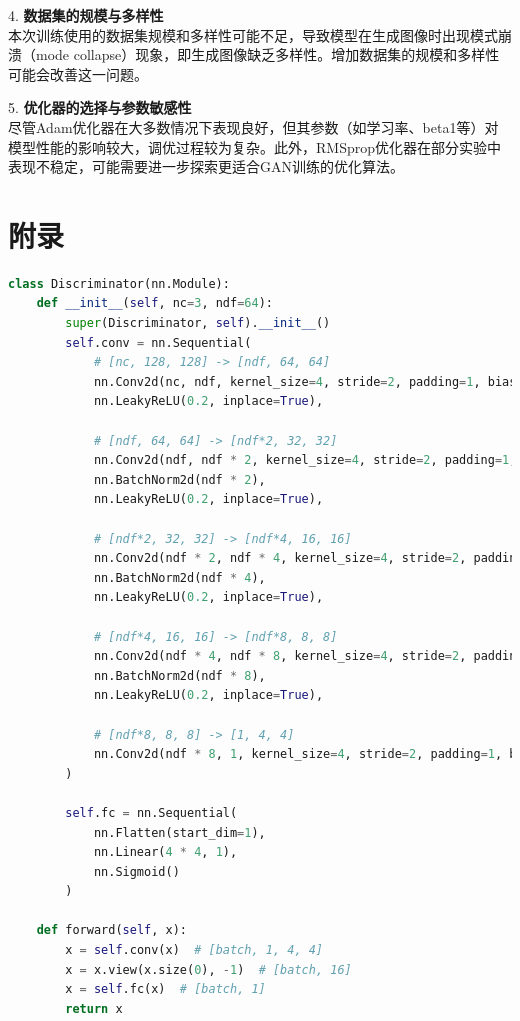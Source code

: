 \documentclass[UTF8]{ctexart}
\begin{document}
4. \textbf{数据集的规模与多样性}\\
   本次训练使用的数据集规模和多样性可能不足，导致模型在生成图像时出现模式崩溃（mode collapse）现象，即生成图像缺乏多样性。增加数据集的规模和多样性可能会改善这一问题。

5. \textbf{优化器的选择与参数敏感性}\\
   尽管Adam优化器在大多数情况下表现良好，但其参数（如学习率、beta1等）对模型性能的影响较大，调优过程较为复杂。此外，RMSprop优化器在部分实验中表现不稳定，可能需要进一步探索更适合GAN训练的优化算法。

   



\newpage
\section{附录}
\begin{lstlisting}[language=Python, caption={判别器设计}, label={lst:code2}, mathescape=true, breaklines=true]
class Discriminator(nn.Module):
    def __init__(self, nc=3, ndf=64):
        super(Discriminator, self).__init__()
        self.conv = nn.Sequential(
            # [nc, 128, 128] -> [ndf, 64, 64]
            nn.Conv2d(nc, ndf, kernel_size=4, stride=2, padding=1, bias=False),
            nn.LeakyReLU(0.2, inplace=True),
            
            # [ndf, 64, 64] -> [ndf*2, 32, 32]
            nn.Conv2d(ndf, ndf * 2, kernel_size=4, stride=2, padding=1, bias=False),
            nn.BatchNorm2d(ndf * 2),
            nn.LeakyReLU(0.2, inplace=True),
            
            # [ndf*2, 32, 32] -> [ndf*4, 16, 16]
            nn.Conv2d(ndf * 2, ndf * 4, kernel_size=4, stride=2, padding=1, bias=False),
            nn.BatchNorm2d(ndf * 4),
            nn.LeakyReLU(0.2, inplace=True),
            
            # [ndf*4, 16, 16] -> [ndf*8, 8, 8]
            nn.Conv2d(ndf * 4, ndf * 8, kernel_size=4, stride=2, padding=1, bias=False),
            nn.BatchNorm2d(ndf * 8),
            nn.LeakyReLU(0.2, inplace=True),
            
            # [ndf*8, 8, 8] -> [1, 4, 4]
            nn.Conv2d(ndf * 8, 1, kernel_size=4, stride=2, padding=1, bias=False)
        )
        
        self.fc = nn.Sequential(
            nn.Flatten(start_dim=1),
            nn.Linear(4 * 4, 1),
            nn.Sigmoid()
        )
    
    def forward(self, x):
        x = self.conv(x)  # [batch, 1, 4, 4]
        x = x.view(x.size(0), -1)  # [batch, 16]
        x = self.fc(x)  # [batch, 1]
        return x
\end{lstlisting}
\end{document}
